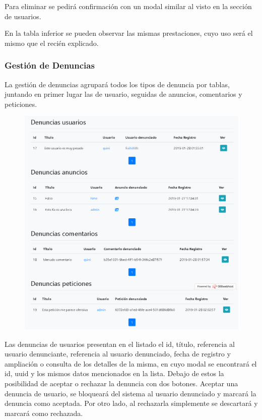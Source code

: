 Para eliminar se pedir\'{a} confirmaci\'{o}n con un modal similar al visto en la secci\'{o}n de usuarios.

En la tabla inferior se pueden observar las mismas prestaciones, cuyo uso ser\'{a} el mismo que el reci\'{e}n explicado.

\subsubsection{Gesti\'{o}n de Denuncias}
La gesti\'{o}n de denuncias agrupar\'{a} todos los tipos de denuncia por tablas, juntando en primer lugar las de usuario, seguidas de anuncios, comentarios y peticiones.

\begin{figure}[h!]
\centering
\includegraphics[width=.9\textwidth]{Img/ManualUsuario/DENUNCIAS_ADMIN.png}
\end{figure}


Las denuncias de usuarios presentan en el listado el id, t\'{i}tulo, referencia al usuario denunciante, referencia al usuario denunciado, fecha de registro y ampliaci\'{o}n o consulta de los detalles de la misma, en cuyo modal se encontrar\'{a} el id, uuid y los mismos datos mencionados en la lista. Debajo de estos la posibilidad de aceptar o rechazar la denuncia con dos botones. Aceptar una denuncia de usuario, se bloquear\'{a} del sistema al usuario denunciado y marcar\'{a} la denuncia como aceptada. Por otro lado, al rechazarla simplemente se descartar\'{a} y marcar\'{a} como rechazada.



